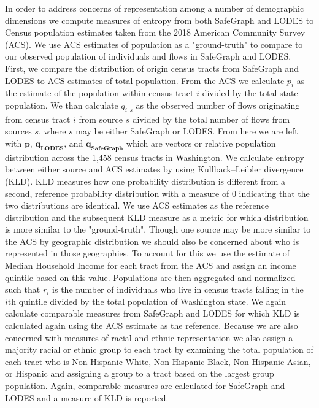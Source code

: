 \documentclass[fleqn,10pt]{olplainarticle}
\begin{document}
In order to address concerns of representation among a number of demographic dimensions we compute measures of entropy from both SafeGraph and LODES to Census population estimates taken from the 2018 American Community Survey (ACS). We use ACS estimates of population as a "ground-truth" to compare to our observed population of individuals and flows in SafeGraph and LODES. First, we compare the distribution of origin census tracts from SafeGraph and LODES to ACS estimates of total population. From the ACS we calculate $p_i$ as the estimate of the population within census tract $i$ divided by the total state population. We than calculate $q_{i,s}$ as the observed number of flows originating from census tract $i$ from source $s$ divided by the total number of flows from sources $s$, where $s$ may be either SafeGraph or LODES. From here we are left with $\boldsymbol{p}$, $\boldsymbol{q_\text{LODES}}$, and $\boldsymbol{q_\text{SafeGraph}}$ which are vectors or relative population distribution across the 1,458 census tracts in Washington. We calculate entropy between either source and ACS estimates by using Kullback–Leibler divergence (KLD). KLD measures how one probability distribution is different from a second, reference probability distribution \citep{Kullback1951} with a measure of 0 indicating that the two distributions are identical. We use ACS estimates as the reference distribution and the subsequent KLD measure as a metric for which distribution is more similar to the "ground-truth". Though one source may be more similar to the ACS by geographic distribution we should also be concerned about who is represented in those geographies. To account for this we use the estimate of Median Household Income for each tract from the ACS and assign an income quintile based on this value. Populations are then aggregated and normalized such that $r_i$ is the number of individuals who live in census tracts falling in the $i\text{th}$ quintile divided by the total population of Washington state. We again calculate comparable measures from SafeGraph and LODES for which KLD is calculated again using the ACS estimate as the reference. Because we are also concerned with measures of racial and ethnic representation we also assign a majority racial or ethnic group to each tract by examining the total population of each tract who is Non-Hispanic White, Non-Hispanic Black, Non-Hispanic Asian, or Hispanic and assigning a group to a tract based on the largest group population. Again, comparable measures are calculated for SafeGraph and LODES and a measure of KLD is reported.
\end{document}
